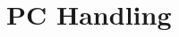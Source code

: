 \documentclass[paper=a4,fontsize=12pt]{scrreprt}
\begin{document}

\section{PC Handling}


\end{document}
